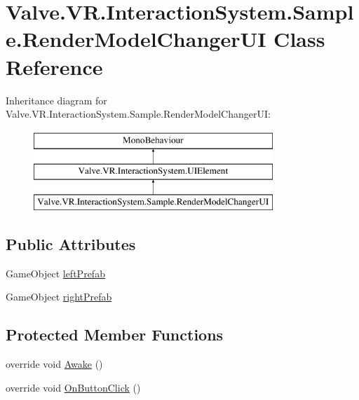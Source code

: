 \hypertarget{class_valve_1_1_v_r_1_1_interaction_system_1_1_sample_1_1_render_model_changer_u_i}{}\section{Valve.\+V\+R.\+Interaction\+System.\+Sample.\+Render\+Model\+Changer\+UI Class Reference}
\label{class_valve_1_1_v_r_1_1_interaction_system_1_1_sample_1_1_render_model_changer_u_i}
Inheritance diagram for Valve.\+V\+R.\+Interaction\+System.\+Sample.\+Render\+Model\+Changer\+UI\+:\begin{figure}[H]
\begin{center}
\leavevmode
\includegraphics[height=3.000000cm]{class_valve_1_1_v_r_1_1_interaction_system_1_1_sample_1_1_render_model_changer_u_i}
\end{center}
\end{figure}
\subsection*{Public Attributes}
\begin{DoxyCompactItemize}
\item 
Game\+Object \mbox{\hyperlink{class_valve_1_1_v_r_1_1_interaction_system_1_1_sample_1_1_render_model_changer_u_i_a79fa5907344cb3e6bc2812c0aef6dcad}{left\+Prefab}}
\item 
Game\+Object \mbox{\hyperlink{class_valve_1_1_v_r_1_1_interaction_system_1_1_sample_1_1_render_model_changer_u_i_a7685910ddfed4cc210144fdc1ee80bb9}{right\+Prefab}}
\end{DoxyCompactItemize}
\subsection*{Protected Member Functions}
\begin{DoxyCompactItemize}
\item 
override void \mbox{\hyperlink{class_valve_1_1_v_r_1_1_interaction_system_1_1_sample_1_1_render_model_changer_u_i_a67f90d46a8a14997ee227030d2d0c458}{Awake}} ()
\item 
override void \mbox{\hyperlink{class_valve_1_1_v_r_1_1_interaction_system_1_1_sample_1_1_render_model_changer_u_i_a8b1eff8a1a58fca51ee9a963bff8b7f5}{On\+Button\+Click}} ()
\end{DoxyCompactItemize}
